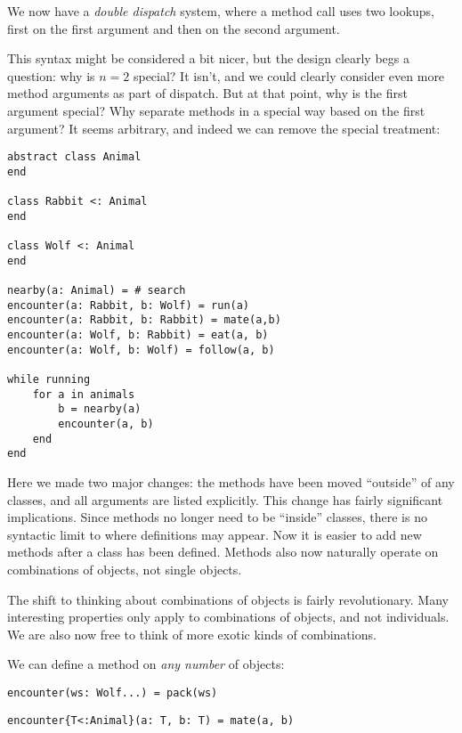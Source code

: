 We now have a \emph{double dispatch} system, where a method call
uses two lookups, first on the first argument and then on the
second argument.

This syntax might be considered a bit nicer, but the design
clearly begs a question: why is $n=2$ special? It isn't, and we
could clearly consider even more method arguments as part of
dispatch. But at that point, why is the first argument special?
Why separate methods in a special way based on the first argument?
It seems arbitrary, and indeed we can remove the special treatment:

\begin{singlespace}
\begin{verbatim}
abstract class Animal
end

class Rabbit <: Animal
end

class Wolf <: Animal
end

nearby(a: Animal) = # search
encounter(a: Rabbit, b: Wolf) = run(a)
encounter(a: Rabbit, b: Rabbit) = mate(a,b)
encounter(a: Wolf, b: Rabbit) = eat(a, b)
encounter(a: Wolf, b: Wolf) = follow(a, b)

while running
    for a in animals
        b = nearby(a)
        encounter(a, b)
    end
end
\end{verbatim}
\end{singlespace}

Here we made two major changes: the methods have been moved ``outside''
of any classes, and all arguments are listed explicitly. This change
has fairly significant implications. Since methods no longer need to be
``inside'' classes, there is no syntactic limit to where definitions
may appear. Now it is easier to add new methods after a class has
been defined. Methods also now naturally operate on combinations of
objects, not single objects.

The shift to thinking about combinations of objects is fairly
revolutionary. Many interesting properties only apply to combinations
of objects, and not individuals. We are also now free to think of
more exotic kinds of combinations.

We can define a method on \emph{any number} of objects:

\begin{verbatim}
encounter(ws: Wolf...) = pack(ws)
\end{verbatim}


\begin{verbatim}
encounter{T<:Animal}(a: T, b: T) = mate(a, b)
\end{verbatim}



